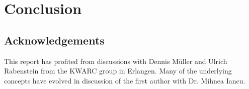 \section{Conclusion}\label{sec:concl}

\subsection*{Acknowledgements}
This report has profited from discussions with Dennis M\"uller and Ulrich Rabenstein from the
KWARC group in Erlangen. Many of the underlying concepts have evolved in discussion of
the first author with Dr. Mihnea Iancu.


